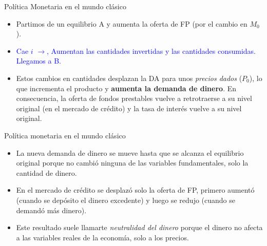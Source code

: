 \documentclass{beamer}
\begin{document}
\begin{frame}{Política Monetaria en el mundo clásico}
\begin{itemize}
        \item Partimos de un equilibrio A y aumenta la oferta de FP (por el cambio en $M_0$).
        \item \textcolor{blue}{Cae $i$ $\rightarrow$, Aumentan las cantidades invertidas y las cantidades consumidas. Llegamos a B.}
        \item \textcolor{green!50!black}{Estos cambios en cantidades desplazan la DA para unos \textit{precios dados} ($P_0$), lo que incrementa el producto y \textbf{aumenta la demanda de dinero}. En consecuencia, la oferta de fondos prestables vuelve a retrotraerse a su nivel original (en el mercado de crédito) y la tasa de interés vuelve a su nivel original.}
    \end{itemize} 
\end{frame}


\begin{frame}{Política monetaria en el mundo clásico}
    \begin{itemize}
        \item La nueva demanda de dinero se mueve hasta que se alcanza el equilibrio original porque no cambió ninguna de las variables fundamentales, solo la cantidad de dinero.
        \item En el mercado de crédito se desplazó solo la oferta de FP, primero aumentó (cuando se depósito el dinero excedente) y luego se redujo (cuando se demandó más dinero).
        \item Este resultado suele llamarte \textit{neutralidad del dinero} porque el dinero no afecta a las variables reales de la economía, solo a los precios.
    \end{itemize}
\end{frame}
\end{document}
